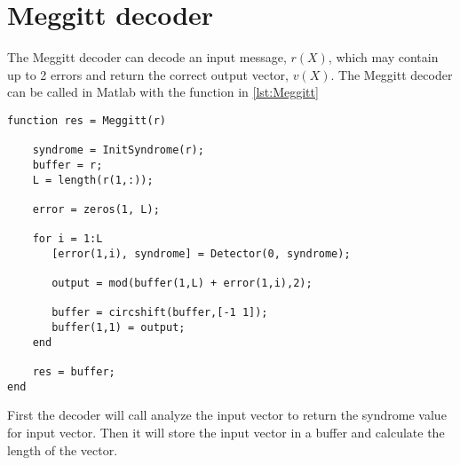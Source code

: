 \documentclass[Main]{subfiles}
\begin{document}
\section{Meggitt decoder}












The Meggitt decoder can decode an input message, $r(X)$, which may contain up to 2 errors and return the correct output vector, $v(X)$.
The Meggitt decoder can be called in Matlab with the function in \codeTitle \ref{lst:Meggitt}

\begin{lstlisting}[caption=Meggit decoder function, style=Code-Matlab, label=lst:Meggitt]
function res = Meggitt(r)

	syndrome = InitSyndrome(r);
	buffer = r;
	L = length(r(1,:));
	
	error = zeros(1, L);
	
	for i = 1:L
	   [error(1,i), syndrome] = Detector(0, syndrome); 
	
	   output = mod(buffer(1,L) + error(1,i),2);
	
	   buffer = circshift(buffer,[-1 1]);
	   buffer(1,1) = output;   
	end
	
	res = buffer;
end
\end{lstlisting}
First the decoder will call analyze the input vector to return the syndrome value for input vector.
Then it will store the input vector in a buffer and calculate the length of the vector.
\end{document}
